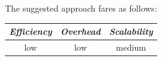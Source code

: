 %
The suggested approach fares as follows:
\begin{center}
{\footnotesize
\begin{tabular}{ccc}
\emph{Efficiency} & \emph{Overhead} & \emph{Scalability} \\
\hline
low &
low &
%
medium
\end{tabular}
}
\end{center}

